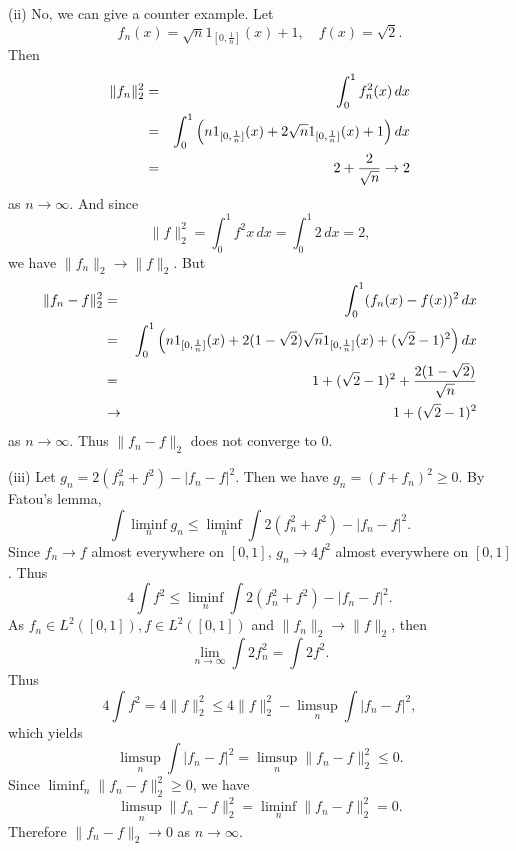 \documentclass[12pt,a4paper]{ctexart}
\begin{document}
\vspace{6pt}

(ii) No, we can give a counter example. Let
$$f_n(x) = \sqrt{n} 1_{[0, \frac{1}{n}]}(x) + 1, \quad f(x) = \sqrt{2}.$$
Then
\begin{eqnarray*}
    \|f_n\|_2^2  & = & \int_{0}^{1} f_n^2(x) \, d x \\
    & = & \int_{0}^{1} \Big{(} n 1_{[0,\frac{1}{n}]}(x) + 2 \sqrt{n} 1_{[0, \frac{1}{n}]}(x) + 1 \Big{)} \, d x \\
    & = & 2 + \frac{2}{\sqrt{n}} \to 2
\end{eqnarray*}
as $n \to \infty$. And since
$$\|f\|_2^2 = \int_{0}^{1} f^2{x} \, d x = \int_{0}^{1} 2 \, d x = 2,$$
we have $\|f_n\|_2 \to \|f\|_2$. But
\begin{eqnarray*}
    \|f_n - f \|_2^2  & = & \int_{0}^{1} (f_n(x) - f(x))^2 \, d x \\
    & = & \int_{0}^{1} \Big{(} n 1_{[0,\frac{1}{n}]}(x) + 2(1 - \sqrt{2}) \sqrt{n} 1_{[0, \frac{1}{n}]}(x) + (\sqrt{2} - 1)^2 \Big{)} \, d x \\
    & = & 1 + (\sqrt{2} - 1)^2 + \frac{2(1 - \sqrt{2})}{\sqrt{n}} \\
    & \to & 1 + (\sqrt{2} - 1)^2
\end{eqnarray*}
as $n \to \infty$. Thus $\|f_n - f\|_2$ does not converge to $0$.

(iii) Let $g_n = 2(f_n^2 + f^2) - |f_n - f|^2$. Then we have $g_n = (f + f_n)^2 \geq 0$. By Fatou's lemma,
\begin{equation*}
    \int \liminf_{n} g_n \leq \liminf_{n} \int 2(f_n^2 + f^2) - |f_n - f|^2.
\end{equation*}
Since $f_n \to f$ almost everywhere on $[0,1]$, $g_n \to 4 f^2$ almost everywhere on $[0,1]$. Thus
\begin{equation*}
   4 \int  f^2 \leq \liminf_{n} \int 2(f_n^2 + f^2) - |f_n - f|^2.
\end{equation*}
As $f_n \in L^2([0,1]), f \in L^2([0,1])$ and $\|f_n\|_2 \to \|f\|_2$, then
\begin{equation*}
    \lim_{n \to \infty} \int 2 f_n^2 = \int 2 f^2.
\end{equation*}
Thus
\begin{equation*}
   4 \int  f^2 = 4 \|f\|_2^2 \leq  4 \|f\|_2^2 - \limsup_{n} \int |f_n - f|^2,
\end{equation*}
which yields
\begin{equation*}
    \limsup_{n} \int |f_n - f|^2 = \limsup_{n} \|f_n - f\|_2^2 \leq 0.
\end{equation*}
Since $\liminf_{n} \|f_n - f\|_2^2 \geq 0$, we have
\begin{equation*}
    \limsup_{n} \|f_n - f\|_2^2  = \liminf_{n} \|f_n - f\|_2^2 = 0.
\end{equation*}
Therefore $\|f_n - f\|_2 \to 0$ as $n \to \infty$.
\end{document}

